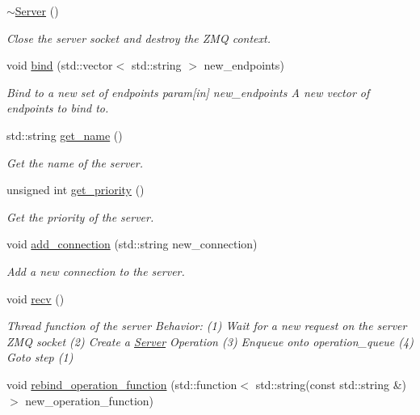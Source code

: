 \begin{DoxyCompactItemize}
\hyperlink{classzcm_1_1Server_a1aac28d71da6d5e66fff629d7206b3c6}{$\sim$\+Server} ()
\begin{DoxyCompactList}\small\item\em Close the server socket and destroy the Z\+MQ context. \end{DoxyCompactList}\item 
void \hyperlink{classzcm_1_1Server_a663b9c844bd17d3174cdfe367fe7d2e2}{bind} (std\+::vector$<$ std\+::string $>$ new\+\_\+endpoints)
\begin{DoxyCompactList}\small\item\em Bind to a new set of endpoints param\mbox{[}in\mbox{]} new\+\_\+endpoints A new vector of endpoints to bind to. \end{DoxyCompactList}\item 
std\+::string \hyperlink{classzcm_1_1Server_adff186f44785ea8c17f3d96cf8e254e6}{get\+\_\+name} ()
\begin{DoxyCompactList}\small\item\em Get the name of the server. \end{DoxyCompactList}\item 
unsigned int \hyperlink{classzcm_1_1Server_ae570e2fe8f61761951d79c9c5b6ea988}{get\+\_\+priority} ()
\begin{DoxyCompactList}\small\item\em Get the priority of the server. \end{DoxyCompactList}\item 
void \hyperlink{classzcm_1_1Server_ad1c5e86ea9384c95774046ac469092b7}{add\+\_\+connection} (std\+::string new\+\_\+connection)
\begin{DoxyCompactList}\small\item\em Add a new connection to the server. \end{DoxyCompactList}\item 
void \hyperlink{classzcm_1_1Server_ae30eb0c0b4cfad74b7f73c17815511eb}{recv} ()
\begin{DoxyCompactList}\small\item\em Thread function of the server Behavior\+: (1) Wait for a new request on the server Z\+MQ socket (2) Create a \hyperlink{classzcm_1_1Server}{Server} Operation (3) Enqueue onto operation\+\_\+queue (4) Goto step (1) \end{DoxyCompactList}\item 
void \hyperlink{classzcm_1_1Server_ae76811b738db33b85e5c39307f08c5e2}{rebind\+\_\+operation\+\_\+function} (std\+::function$<$ std\+::string(const std\+::string \&)$>$ new\+\_\+operation\+\_\+function)

\end{DoxyCompactItemize}
